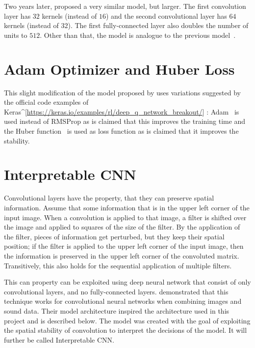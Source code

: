 \section{\textcite{mnih_human-level_2015}}

Two years later, \textcite{mnih_human-level_2015} proposed a very similar model, but larger. The first convolution layer has $32$ kernels (instead of $16$) and the second convolutional layer has $64$ kernels (instead of $32$). The first fully-connected layer also doubles the number of units to $512$. Other than that, the model is analogue to the previous model~\parencite{mnih_playing_2013,mnih_human-level_2015}.

\section{Adam Optimizer and Huber Loss}

This slight modification of the model proposed by \textcite{mnih_human-level_2015} uses variations suggested by the official code examples of Keras\textasciicircum{}[\url{https://keras.io/examples/rl/deep_q_network_breakout/}] : Adam~\parencite{kingma_adam_2017} is used instead of RMSProp as is claimed that this improves the training time and the Huber function~\parencite{huber_robust_1964} is used as loss function as is claimed that it improves the stability.

\section{Interpretable CNN}

Convolutional layers have the property, that they can preserve spatial information. Assume that some information that is in the upper left corner of the input image. When a convolution is applied to that image, a filter is shifted over the image and applied to squares of the size of the filter. By the application of the filter, pieces of information get perturbed, but they keep their spatial position; if the filter is  applied to the upper left corner of the input image, then the information is preserved in the upper left corner of the convoluted matrix. Transitively, this also holds for the sequential application of multiple filters.

This can property can be exploited using deep neural network that consist of only convolutional layers, and no fully-connected layers. \textcite{arandjelovic_objects_2018} demonstrated that this technique works for convolutional neural networks when combining images and sound data. Their model architecture inspired the architecture used in this project and is described below. The model was created with the goal of exploiting the spatial stability of convolution to interpret the decisions of the model. It will further be called Interpretable CNN.

